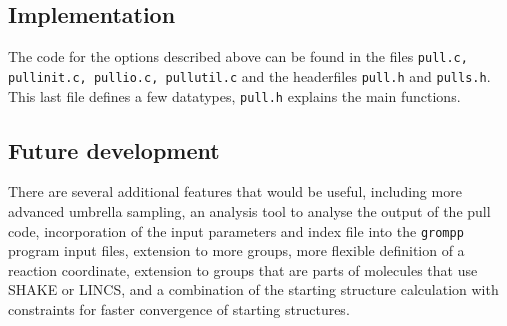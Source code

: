 \subsection{Implementation}

The code for the options described above can be found in the files
{\tt pull.c, pullinit.c, pullio.c, pullutil.c} and the headerfiles
{\tt pull.h} and {\tt pulls.h}. This last file defines a few
datatypes, {\tt pull.h} explains the main functions. 

\subsection{Future development}
There are several additional features that would be useful, including
more advanced umbrella sampling, an analysis tool to analyse the
output of the pull code, incorporation of the input parameters and
index file into the {\tt grompp} program input files, extension to more
groups, more flexible definition of a reaction coordinate, extension
to groups that are parts of molecules that use SHAKE or LINCS, and a
combination of the starting structure calculation with constraints for
faster convergence of starting structures.







